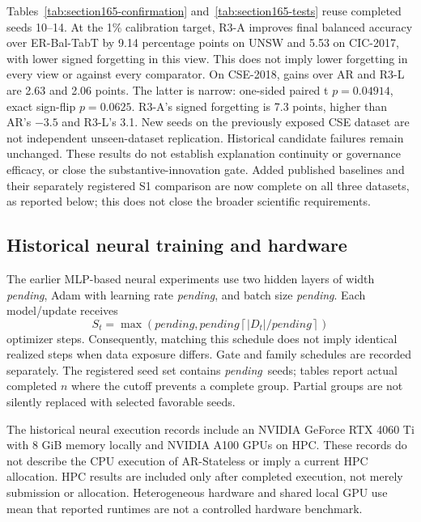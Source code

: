 \documentclass[10pt,twocolumn]{article}
\newcommand{\pending}{\textit{pending}}
\providecommand{\BatchSize}{\pending}
\providecommand{\EpochBudget}{\pending}
\providecommand{\MinSteps}{\pending}
\providecommand{\HiddenWidth}{\pending}
\providecommand{\LearningRate}{\pending}
\providecommand{\SeedCount}{\pending}
\begin{document}
Tables~\ref{tab:section165-confirmation} and~\ref{tab:section165-tests}
reuse completed seeds 10--14. At the 1\% calibration target, R3-A improves
final balanced accuracy over ER-Bal-TabT by 9.14 percentage points on UNSW
and 5.53 on CIC-2017, with lower signed forgetting in this view. This does
not imply lower forgetting in every view or against every comparator.
On CSE-2018, gains over AR and R3-L are 2.63 and 2.06 points. The latter
is narrow: one-sided paired t $p=0.04914$, exact sign-flip $p=0.0625$.
R3-A's signed forgetting is 7.3 points, higher than AR's $-3.5$ and R3-L's
3.1. New seeds on the previously exposed CSE dataset are not independent
unseen-dataset replication. Historical candidate failures remain unchanged.
These results do not establish explanation continuity or governance efficacy,
or close the substantive-innovation gate. Added published baselines and their
separately registered S1 comparison are now complete on all three datasets, as reported below; this does not close the broader scientific requirements.


\subsection{Historical neural training and hardware}
The earlier MLP-based neural experiments use two hidden layers of width \HiddenWidth, Adam with learning rate \LearningRate, and batch size \BatchSize. Each model/update receives
\begin{equation}
 S_t=\max\!\left(\MinSteps,\EpochBudget\left\lceil |D_t|/\BatchSize\right\rceil\right)
\end{equation}
optimizer steps. Consequently, matching this schedule does not imply identical realized steps when data exposure differs. Gate and family schedules are recorded separately. The registered seed set contains \SeedCount\ seeds; tables report actual completed $n$ where the cutoff prevents a complete group. Partial groups are not silently replaced with selected favorable seeds.

The historical neural execution records include an NVIDIA GeForce RTX 4060 Ti with 8 GiB memory locally and NVIDIA A100 GPUs on HPC. These records do not describe the CPU execution of AR-Stateless or imply a current HPC allocation. HPC results are included only after completed execution, not merely submission or allocation. Heterogeneous hardware and shared local GPU use mean that reported runtimes are not a controlled hardware benchmark.
\end{document}
